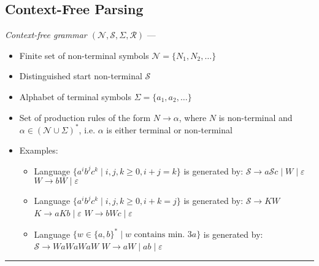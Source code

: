 \subsection*{Context-Free Parsing}
\emph{Context-free grammar $(\mathcal{N}, \mathcal{S}, \Sigma, \mathcal{R})$} ---
\begin{itemize}
    \item Finite set of non-terminal symbols $\mathcal{N} = \{N_1, N_2, \dots\}$
    \item Distinguished start non-terminal $\mathcal{S}$
    \item Alphabet of terminal symbols $\Sigma = \{a_1, a_2, \dots\}$
    \item Set of production rules of the form $N \to \alpha$, where $N$ is non-terminal and $\alpha \in (\mathcal{N} \cup \Sigma)^*$, i.e. $\alpha$ is either terminal or non-terminal
    \item Examples:
    \begin{itemize}
        \item Language $\{a^i b^j c^k \mid i, j, k \geq 0, i + j = k\}$ is generated by:
        $
        \mathcal{S} \to a \mathcal{S} c \mid W \mid \varepsilon$
        $W \to bW \mid \varepsilon
        $
        \item Language $\{a^i b^j c^k \mid i, j, k \geq 0, i + k = j\}$ is generated by:
        $
        \mathcal{S} \to KW$
        $K \to aKb \mid \varepsilon$
        $W \to bWc \mid \varepsilon$
        \item Language $\{w \in \{a, b\}^* \mid w \textrm{ contains min. }3 a\}$ is generated by:
        $
        \mathcal{S} \to WaW aW aW$
        $W \to aW \mid ab \mid \varepsilon
        $
    \end{itemize}
\end{itemize}

{\color{lightgray}\hrule height 0.001mm}

